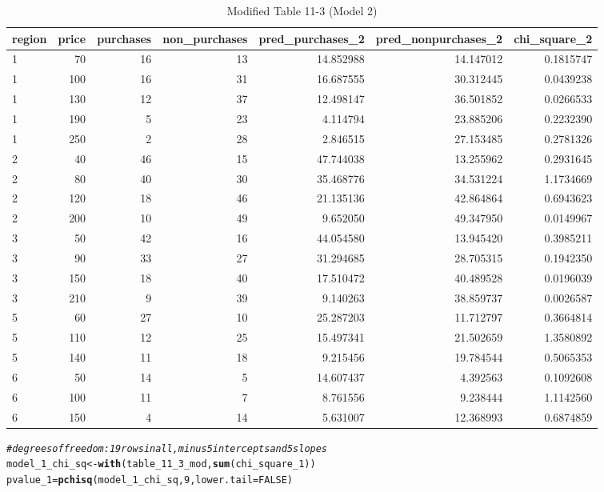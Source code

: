\documentclass[11pt,notitlepage]{article}\usepackage[]{graphicx}\usepackage[]{color}
\makeatletter
\newcommand{\hlnum}[1]{\textcolor[rgb]{0.686,0.059,0.569}{#1}}%
\newcommand{\hlcom}[1]{\textcolor[rgb]{0.678,0.584,0.686}{\textit{#1}}}%
\newcommand{\hlstd}[1]{\textcolor[rgb]{0.345,0.345,0.345}{#1}}%
\newcommand{\hlkwb}[1]{\textcolor[rgb]{0.69,0.353,0.396}{#1}}%
\newcommand{\hlkwc}[1]{\textcolor[rgb]{0.333,0.667,0.333}{#1}}%
\newcommand{\hlkwd}[1]{\textcolor[rgb]{0.737,0.353,0.396}{\textbf{#1}}}%
\newenvironment{kframe}{%
 \def\at@end@of@kframe{}%
 \ifinner\ifhmode%
  \def\at@end@of@kframe{\end{minipage}}%
  \begin{minipage}{\columnwidth}%
 \fi\fi%
 \def\FrameCommand##1{\hskip\@totalleftmargin \hskip-\fboxsep
 \colorbox{shadecolor}{##1}\hskip-\fboxsep
     \hskip-\linewidth \hskip-\@totalleftmargin \hskip\columnwidth}%
 \MakeFramed {\advance\hsize-\width
   \@totalleftmargin\z@ \linewidth\hsize
   \@setminipage}}%
 {\par\unskip\endMakeFramed%
 \at@end@of@kframe}
\newenvironment{knitrout}{}{} %
\makeatother
\begin{document}
\begin{enumerate}[a)]
\begin{knitrout}
\begin{table}
\caption{Modified Table 11-3 (Model 2)}
\begin{tabular}{l|r|r|r|r|r|r}
\hline
region & price & purchases & non\_purchases & pred\_purchases\_2 & pred\_nonpurchases\_2 & chi\_square\_2\\
\hline
1 & 70 & 16 & 13 & 14.852988 & 14.147012 & 0.1815747\\
\hline
1 & 100 & 16 & 31 & 16.687555 & 30.312445 & 0.0439238\\
\hline
1 & 130 & 12 & 37 & 12.498147 & 36.501852 & 0.0266533\\
\hline
1 & 190 & 5 & 23 & 4.114794 & 23.885206 & 0.2232390\\
\hline
1 & 250 & 2 & 28 & 2.846515 & 27.153485 & 0.2781326\\
\hline
2 & 40 & 46 & 15 & 47.744038 & 13.255962 & 0.2931645\\
\hline
2 & 80 & 40 & 30 & 35.468776 & 34.531224 & 1.1734669\\
\hline
2 & 120 & 18 & 46 & 21.135136 & 42.864864 & 0.6943623\\
\hline
2 & 200 & 10 & 49 & 9.652050 & 49.347950 & 0.0149967\\
\hline
3 & 50 & 42 & 16 & 44.054580 & 13.945420 & 0.3985211\\
\hline
3 & 90 & 33 & 27 & 31.294685 & 28.705315 & 0.1942350\\
\hline
3 & 150 & 18 & 40 & 17.510472 & 40.489528 & 0.0196039\\
\hline
3 & 210 & 9 & 39 & 9.140263 & 38.859737 & 0.0026587\\
\hline
5 & 60 & 27 & 10 & 25.287203 & 11.712797 & 0.3664814\\
\hline
5 & 110 & 12 & 25 & 15.497341 & 21.502659 & 1.3580892\\
\hline
5 & 140 & 11 & 18 & 9.215456 & 19.784544 & 0.5065353\\
\hline
6 & 50 & 14 & 5 & 14.607437 & 4.392563 & 0.1092608\\
\hline
6 & 100 & 11 & 7 & 8.761556 & 9.238444 & 1.1142560\\
\hline
6 & 150 & 4 & 14 & 5.631007 & 12.368993 & 0.6874859\\
\hline
\end{tabular}
\end{table}

\begin{kframe}\begin{alltt}
\hlcom{# degrees of freedom: 19 rows in all, minus 5 intercepts and 5 slopes}
\hlstd{model_1_chi_sq} \hlkwb{<-} \hlkwd{with}\hlstd{(table_11_3_mod,} \hlkwd{sum}\hlstd{(chi_square_1))}
\hlstd{pvalue_1} \hlkwb{=} \hlkwd{pchisq}\hlstd{(model_1_chi_sq,} \hlnum{9}\hlstd{,} \hlkwc{lower.tail} \hlstd{=} \hlnum{FALSE}\hlstd{)}


\end{alltt}
\end{kframe}
\end{knitrout}
\end{enumerate}
\end{document}
